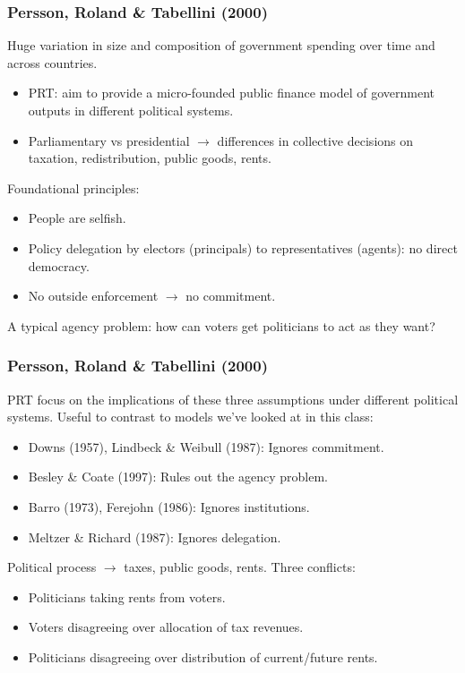 \documentclass[11pt,aspectratio=169]{beamer}
\begin{document}
\begin{frame}
\frametitle{Persson, Roland \& Tabellini (2000)}

Huge variation in size and composition of government spending over time and across countries.

\begin{itemize}
\item PRT: aim to provide a micro-founded public finance model of government outputs in different political systems. 
\item Parliamentary vs presidential $\rightarrow$ differences in collective decisions on taxation, redistribution, public goods, rents.
\end{itemize}

\bigskip

\noindent Foundational principles:

\begin{itemize}
\item People are selfish.
\item Policy delegation by electors (principals) to  representatives (agents): no direct democracy.
\item No outside enforcement $\rightarrow$ no commitment.
\end{itemize}

\bigskip

\noindent A typical agency problem: how can voters get politicians to act as they want? 

\end{frame}


\begin{frame}
\frametitle{Persson, Roland \& Tabellini (2000)}

PRT focus on the implications of these three assumptions under different political systems. Useful to contrast to models we've looked at in this class:

\begin{itemize}
\item Downs (1957), Lindbeck \& Weibull (1987): Ignores commitment.
\item Besley \& Coate (1997): Rules out the agency problem.
\item Barro (1973), Ferejohn (1986): Ignores institutions.
\item Meltzer \& Richard (1987): Ignores delegation.
\end{itemize}

\bigskip

Political process $\rightarrow$ taxes, public goods, rents. Three conflicts:
\begin{itemize}
\item Politicians taking rents from voters.
\item Voters disagreeing over allocation of tax revenues.
\item Politicians disagreeing over distribution of current/future rents.
\end{itemize}

\end{frame}
\end{document}
